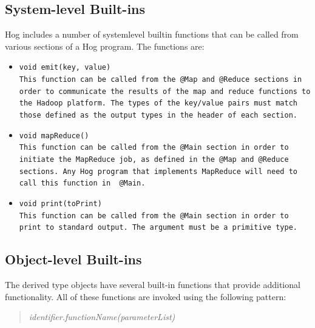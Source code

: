 \documentclass{report}
\begin{document}
\subsection{System-level Built-ins} %
\label{sub:system_level_built_ins}

Hog includes a number of system­level built­in functions that can be called from
various sections of a Hog program. The functions are:

\begin{itemize} 

\item[] \tt void emit(key, value) \rm \\

This function can be called from the \tt @Map \rm and \tt @Reduce \rm sections in
order to communicate the results of the map and reduce functions to the Hadoop
platform. The types of the key/value pairs must match those defined as the output
types in the header of each section.

\item[] \tt void mapReduce() \rm \\

This function can be called from the \tt @Main \rm section in order to initiate
the MapReduce job, as defined in the \tt @Map \rm and \tt @Reduce \rm sections.
Any Hog program that implements MapReduce will need to call this function in \tt
@Main\rm.

\item[] \tt void print(toPrint) \rm \\

This function can be called from the \tt @Main \rm section in order to print to
standard output. The argument must be a primitive type.

\end{itemize}


\subsection{Object-level Built-ins} %
\label{sub:object_level_built_ins}

The derived type objects have several built-in functions that provide
additional functionality. All of these functions are invoked using the
following pattern:

\begin{quotation}
\emph{identifier.functionName(parameterList)}
\end{quotation}
\end{document}
